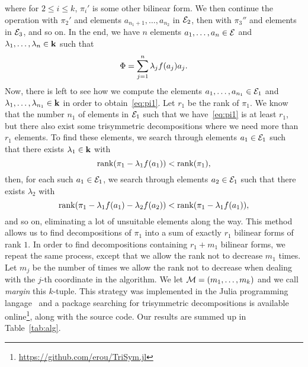 \documentclass[11pt]{article}
\begin{document}
where for $2\leq i \leq k$, $\pi_i'$ is some other bilinear form.
We then continue the operation with $\pi_2'$ and elements $a_{n_1+1}, \dots,
a_{n_2}$ in $\mathcal{E}_2$, then with $\pi_3''$ and elements in $\mathcal{E}_3$, and so on. In
the end, we have $n$ elements $a_1, \dots, a_n\in \mathcal{E}$ and $\lambda_1, \dots,
\lambda_n\in\mathbf{k}$ such that
\[
  \Phi = \sum_{j=1}^{n}\lambda_jf(a_j)a_j.
\]
Now, there is left to see how we compute the elements $a_1, \dots,
a_{n_1}\in\mathcal{E}_1$ and $\lambda_1, \dots, \lambda_{n_1}\in\mathbf{k}$ in order to
obtain~\eqref{eq:pi1}. Let $r_1$ be the rank of $\pi_1$. We know that the number
$n_1$ of elements in $\mathcal{E}_1$ such that we have~\eqref{eq:pi1} is at least $r_1$,
but there also exist some trisymmetric decompositions where we need more than $r_1$
elements. To find these elements, we search through elements $a_1\in\mathcal{E}_1$ such that
there exists $\lambda_1\in\mathbf{k}$ with
\[
  \operatorname{rank}(\pi_1-\lambda_1f(a_1))<\operatorname{rank}(\pi_1),
\]
then, for each such $a_1\in\mathcal{E}_1$, we search through elements $a_2\in\mathcal{E}_1$ such that there exists $\lambda_2$
with
\[
  \operatorname{rank}(\pi_1-\lambda_1f(a_1)-\lambda_2f(a_2))<\operatorname{rank}(\pi_1-\lambda_1f(a_1)),
\]
and so on, eliminating a lot of unsuitable elements along the way. This method
allows us to find decompositions of $\pi_1$ into a sum of exactly $r_1$ bilinear forms of
rank $1$. In order to find decompositions containing $r_1+m_1$ bilinear forms, we
repeat the same process, except that we allow the rank not to decrease $m_1$
times. Let $m_j$ be the number of times we allow the rank not to decrease
when dealing with the $j$-th coordinate in the algorithm. We let $\mathcal{M}=(m_1,
\dots, m_k)$ and we call \emph{margin} this $k$-tuple. This strategy was
implemented in the Julia programming
langage~\cite{Julia} and a package searching for trisymmetric decompositions is
available online\footnote{\url{https://github.com/erou/TriSym.jl}}, along with
the source code. Our results are summed up in Table~\ref{tab:alg}.
\end{document}
